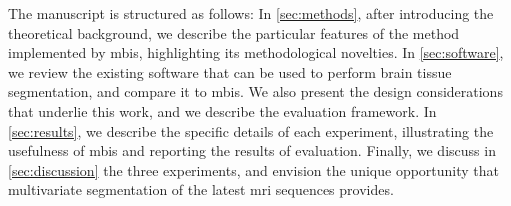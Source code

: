 The manuscript is structured as follows: In \autoref{sec:methods},
  after introducing the theoretical background, we describe the
  particular features of the method implemented by \gls*{mbis},
  highlighting its methodological novelties.
In \autoref{sec:software}, we review the existing software that can be
  used to perform brain tissue segmentation, and compare it to \gls*{mbis}.
We also present the design considerations that underlie
  this work, and we describe the evaluation framework.
In \autoref{sec:results}, we describe the specific details of each
  experiment, illustrating the usefulness of \gls*{mbis}
  and reporting the results of evaluation.
Finally, we discuss in \autoref{sec:discussion} the three 
  experiments, and envision the unique opportunity that
  multivariate segmentation of the latest \gls*{mri} sequences
  provides.